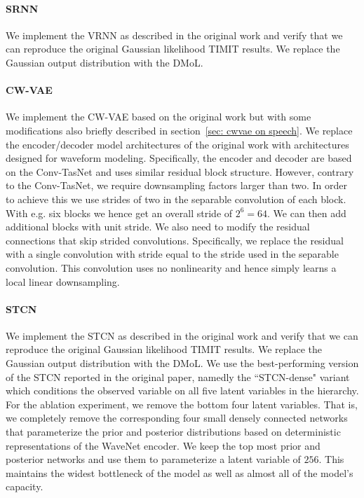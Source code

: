 {\paragraph{SRNN}
We implement the VRNN as described in the original work \parencite{fraccaro_sequential_2016} and verify that we can reproduce the original Gaussian likelihood TIMIT results. We replace the Gaussian output distribution with the DMoL. 

\paragraph{CW-VAE} We implement the CW-VAE based on the original work \parencite{saxena_clockwork_2021} but with some modifications also briefly described in section~\cref{sec: cwvae on speech}. We replace the encoder/decoder model architectures of the original work with architectures designed for waveform modeling. Specifically, the encoder and decoder are based on the Conv-TasNet \parencite{luo_conv-tasnet_2019} and uses similar residual block structure. However, contrary to the Conv-TasNet, we require downsampling factors larger than two. In order to achieve this we use strides of two in the separable convolution of each block. With e.g. six blocks we hence get an overall stride of $2^6=64$. We can then add additional blocks with unit stride.
We also need to modify the residual connections that skip strided convolutions. Specifically, we replace the residual with a single convolution with stride equal to the stride used in the separable convolution. This convolution uses no nonlinearity and hence simply learns a local linear downsampling.

\paragraph{STCN} We implement the STCN as described in the original work \parencite{aksan_stcn_2019} and verify that we can reproduce the original Gaussian likelihood TIMIT results. We replace the Gaussian output distribution with the DMoL. We use the best-performing version of the STCN reported in the original paper, namedly the ``STCN-dense" variant which conditions the observed variable on all five latent variables in the hierarchy. For the ablation experiment, we remove the bottom four latent variables. That is, we completely remove the corresponding four small densely connected networks that parameterize the prior and posterior distributions based on deterministic representations of the WaveNet encoder. We keep the top most prior and posterior networks and use them to parameterize a latent variable of $256$. This maintains the widest bottleneck of the model as well as almost all of the model's capacity.

}
